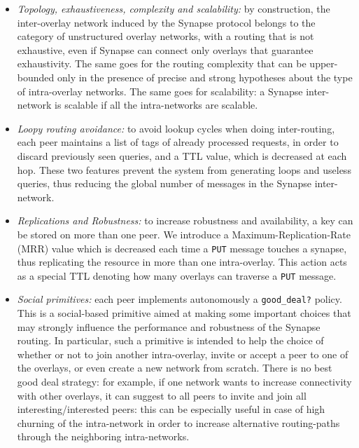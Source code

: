 \begin{itemize}
\item {\em Topology, exhaustiveness, complexity and scalability:} by
  construction, the inter-overlay network induced by the Synapse
  protocol belongs to the category of unstructured overlay networks,
  with a routing that is not exhaustive, even if Synapse can connect
  only overlays that guarantee exhaustivity. The same goes for the
  routing complexity that can be upper-bounded only in the presence of
  precise and strong hypotheses about the type of intra-overlay
  networks. The same goes for scalability: a Synapse inter-network is
  scalable if all the intra-networks are scalable.



\item {\em Loopy routing avoidance:} to avoid lookup cycles when doing
  inter-routing, each peer maintains a list of tags of already processed
  requests, in order to discard previously seen queries, and a TTL
  value, which is decreased at each hop. These two features prevent the
  system from generating loops and useless queries, thus reducing the
  global number of messages in the Synapse inter-network.

\item {\em Replications and Robustness:} to increase robustness and
  availability, a key can be stored on more than one peer. We
  introduce a Maximum-Replication-Rate (MRR) value which is decreased
  each time a {\tt PUT} message touches a synapse, thus replicating
  the resource in more than one intra-overlay. This action acts as a
  special TTL denoting how many overlays can traverse a {\tt PUT}
  message.

\item {\em Social primitives:} each peer implements autonomously a
  {\tt good\_deal?} policy. This is a social-based primitive aimed at
  making some important choices that may stron\-gly influence the
  performance and robustness of the Synapse routing. In particular,
  such a primitive is intended to help the choice of whether or not to
  join another intra-overlay, invite or accept a peer to one of the
  overlays, or even create a new network from scratch. There is no
  best good deal strategy: for example, if one network wants to
  increase connectivity with other overlays, it can suggest to all
  peers to invite and join all interesting/interested peers: this can
  be especially useful in case of high churning of the intra-network
  in order to increase alternative routing-paths through the
  neighboring intra-networks.
\end{itemize}

